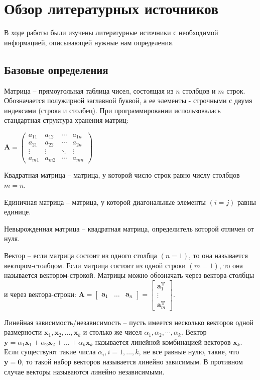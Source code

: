 \newpage

\section{Обзор литературных источников}

В ходе работы были изучены литературные источники с необходимой информацией, описывающей нужные нам определения.

\subsection{Базовые определения}

Матрица – прямоугольная таблица чисел, состоящая из $ n $ столбцов и $ m $ строк. Обозначается полужирной заглавной буквой, а ее элементы - строчными с двумя индексами (строка и столбец). При программировании использовалась стандартная структура хранения матриц:

$ \mathbf{A} = \left( 
\begin{array}{cccc}
a_{11} & a_{12} & \cdots & a_{1n} \\
a_{21} & a_{22} & \cdots & a_{2n} \\
\vdots & \vdots & \ddots & \vdots \\
a_{m1} & a_{m2} & \cdots & a_{mn}
\end{array} \right) $

Квадратная матрица – матрица, у которой число строк равно числу столбцов $ m = n $.

Единичная матрица – матрица, у которой диагональные элементы $ (i = j) $ равны единице.

Невырожденная матрица – квадратная матрица, определитель которой отличен от нуля.

Вектор – если матрица состоит из одного столбца $ (n = 1) $, то она называется вектором-столбцом. Если матрица состоит из одной строки $ (m = 1) $, то она называется вектором-строкой. Матрицы можно обозначать через вектора-столбцы и через вектора-строки: $ \mathbf{A} = \left[ \begin{array}{cccc}
\mathbf{a}_1 & \ldots & \mathbf{a}_n 
\end{array} \right] = \left[ \begin{array}{cccc}
\mathbf{a}^\mathbf{T}_1 \\
\vdots \\
\mathbf{a}^\mathbf{T}_m
\end{array} \right] $.

Линейная зависимость/независимость – пусть имеется несколько векторов одной размерности $ \mathbf{x}_1, \mathbf{x}_2, \ldots ,\mathbf{x}_k $ и столько же чисел $ \alpha_1, \alpha_2, \cdots, \alpha_k $. Вектор $ \mathbf{y}=\alpha_1 \mathbf{x}_1 + \alpha_2 \mathbf{x}_2 + \ldots + \alpha_k \mathbf{x}_k $ называется линейной комбинацией векторов $ \mathbf{x}_k $. Если существуют такие числа $ \alpha_i, i=1, \ldots, k $, не все равные нулю, такие, что $ \mathbf{y}=\mathbf{0} $, то такой набор векторов называется линейно зависимым. В противном случае векторы называются линейно независимыми.

